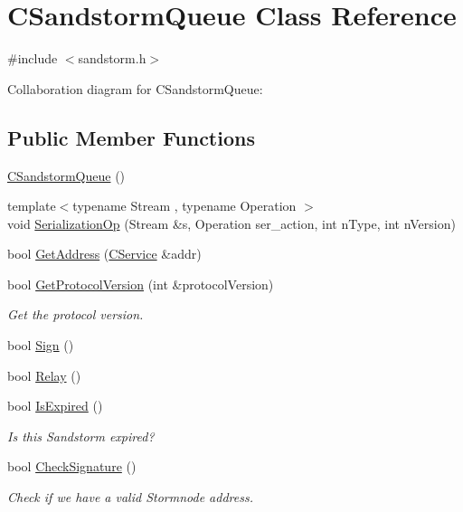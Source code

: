 \hypertarget{class_c_sandstorm_queue}{}\section{C\+Sandstorm\+Queue Class Reference}
\label{class_c_sandstorm_queue}


{\ttfamily \#include $<$sandstorm.\+h$>$}



Collaboration diagram for C\+Sandstorm\+Queue\+:
\subsection*{Public Member Functions}
\begin{DoxyCompactItemize}
\item 
\hyperlink{class_c_sandstorm_queue_ab5252e860c7a8050dbd44d32b892f131}{C\+Sandstorm\+Queue} ()
\item 
{\footnotesize template$<$typename Stream , typename Operation $>$ }\\void \hyperlink{class_c_sandstorm_queue_a9179d7339eb373473bc79c2ac1eb5e9e}{Serialization\+Op} (Stream \&s, Operation ser\+\_\+action, int n\+Type, int n\+Version)
\item 
bool \hyperlink{class_c_sandstorm_queue_a0e1739e9a0c517f0de35807c92db1256}{Get\+Address} (\hyperlink{class_c_service}{C\+Service} \&addr)
\item 
bool \hyperlink{class_c_sandstorm_queue_acaa6374baeb707ed1726ec60c67c1624}{Get\+Protocol\+Version} (int \&protocol\+Version)
\begin{DoxyCompactList}\small\item\em Get the protocol version. \end{DoxyCompactList}\item 
bool \hyperlink{class_c_sandstorm_queue_a7a9c9b05136c8dfe75d9c1d4c81df83b}{Sign} ()
\item 
bool \hyperlink{class_c_sandstorm_queue_af5d648df81c6159c92f20d88af3974d3}{Relay} ()
\item 
bool \hyperlink{class_c_sandstorm_queue_a2b509d89f0a6c0d858a5e28bab2e2017}{Is\+Expired} ()
\begin{DoxyCompactList}\small\item\em Is this Sandstorm expired? \end{DoxyCompactList}\item 
bool \hyperlink{class_c_sandstorm_queue_a8ef2f37969599d3b30bbe479eff56460}{Check\+Signature} ()
\begin{DoxyCompactList}\small\item\em Check if we have a valid Stormnode address. \end{DoxyCompactList}\end{DoxyCompactItemize}
